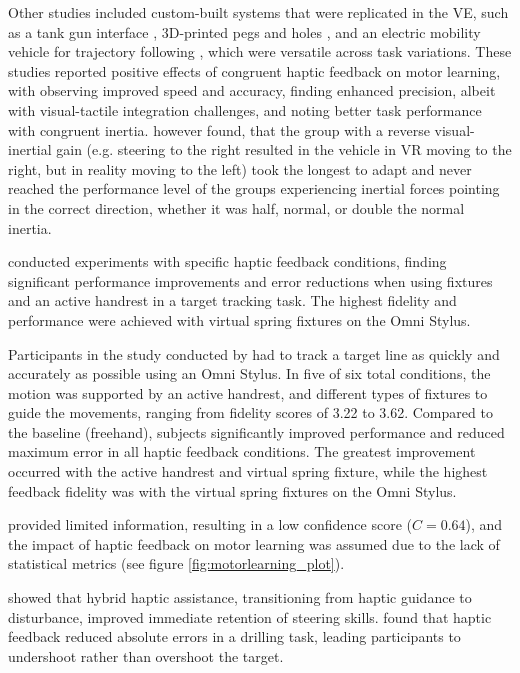 Other studies included custom-built systems that were replicated in the VE, such as a tank gun interface \cite{LiuG2014}, 3D-printed pegs and holes \cite{Mohanty2023}, and an electric mobility vehicle for trajectory following \cite{Macuga2019}, which were versatile across task variations. These studies reported positive effects of congruent haptic feedback on motor learning, with \cite{LiuG2014} observing improved speed and accuracy, \cite{Mohanty2023} finding enhanced precision, albeit with visual-tactile integration challenges, and \cite{Macuga2019} noting better task performance with congruent inertia. \cite{Macuga2019} however found, that the group with a reverse visual-inertial gain (e.g. steering to the right resulted in the vehicle in VR moving to the right, but in reality moving to the left) took the longest to adapt and never reached the performance level of the groups experiencing inertial forces pointing in the correct direction, whether it was half, normal, or double the normal inertia. 

\cite{Fehlberg2012} conducted experiments with specific haptic feedback conditions, finding significant performance improvements and error reductions when using fixtures and an active handrest in a target tracking task. The highest fidelity and performance were achieved with virtual spring fixtures on the Omni Stylus.

Participants in the study conducted by \cite{Fehlberg2012} had to track a target line as quickly and accurately as possible using an Omni Stylus. In five of six total conditions, the motion was supported by an active handrest, and different types of fixtures to guide the movements, ranging from fidelity scores of 3.22 to 3.62.
Compared to the baseline (freehand), subjects significantly improved performance and reduced maximum error in all haptic feedback conditions. The greatest improvement occurred with the active handrest and virtual spring fixture, while the highest feedback fidelity was with the virtual spring fixtures on the Omni Stylus.

\cite{Manivannan2008} provided limited information, resulting in a low confidence score ($C = 0.64$), and the impact of haptic feedback on motor learning was assumed due to the lack of statistical metrics (see figure \ref{fig:motorlearning_plot}).

\cite{LeeH2014} showed that hybrid haptic assistance, transitioning from haptic guidance to disturbance, improved immediate retention of steering skills. \cite{Grant2019} found that haptic feedback reduced absolute errors in a drilling task, leading participants to undershoot rather than overshoot the target.


